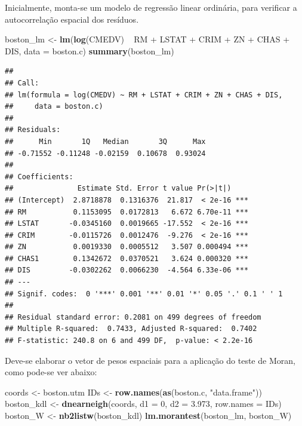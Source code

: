 \documentclass[12pt,]{article}
\newenvironment{Shaded}{\begin{snugshade}}{\end{snugshade}}
\newcommand{\KeywordTok}[1]{\textcolor[rgb]{0.13,0.29,0.53}{\textbf{{#1}}}}
\newcommand{\DataTypeTok}[1]{\textcolor[rgb]{0.13,0.29,0.53}{{#1}}}
\newcommand{\DecValTok}[1]{\textcolor[rgb]{0.00,0.00,0.81}{{#1}}}
\newcommand{\FloatTok}[1]{\textcolor[rgb]{0.00,0.00,0.81}{{#1}}}
\newcommand{\StringTok}[1]{\textcolor[rgb]{0.31,0.60,0.02}{{#1}}}
\newcommand{\NormalTok}[1]{{#1}}
\begin{document}
Inicialmente, monta-se um modelo de regressão linear ordinária, para
verificar a autocorrelação espacial dos resíduos.

\begin{Shaded}
\begin{Highlighting}[]
\NormalTok{boston_lm <-}\StringTok{ }\KeywordTok{lm}\NormalTok{(}\KeywordTok{log}\NormalTok{(CMEDV) ~}\StringTok{ }\NormalTok{RM +}\StringTok{ }\NormalTok{LSTAT +}\StringTok{ }\NormalTok{CRIM +}\StringTok{ }\NormalTok{ZN +}\StringTok{ }\NormalTok{CHAS +}\StringTok{ }\NormalTok{DIS, }\DataTypeTok{data =} \NormalTok{boston.c)}
\KeywordTok{summary}\NormalTok{(boston_lm)}
\end{Highlighting}
\end{Shaded}

\begin{verbatim}
## 
## Call:
## lm(formula = log(CMEDV) ~ RM + LSTAT + CRIM + ZN + CHAS + DIS, 
##     data = boston.c)
## 
## Residuals:
##      Min       1Q   Median       3Q      Max 
## -0.71552 -0.11248 -0.02159  0.10678  0.93024 
## 
## Coefficients:
##               Estimate Std. Error t value Pr(>|t|)    
## (Intercept)  2.8718878  0.1316376  21.817  < 2e-16 ***
## RM           0.1153095  0.0172813   6.672 6.70e-11 ***
## LSTAT       -0.0345160  0.0019665 -17.552  < 2e-16 ***
## CRIM        -0.0115726  0.0012476  -9.276  < 2e-16 ***
## ZN           0.0019330  0.0005512   3.507 0.000494 ***
## CHAS1        0.1342672  0.0370521   3.624 0.000320 ***
## DIS         -0.0302262  0.0066230  -4.564 6.33e-06 ***
## ---
## Signif. codes:  0 '***' 0.001 '**' 0.01 '*' 0.05 '.' 0.1 ' ' 1
## 
## Residual standard error: 0.2081 on 499 degrees of freedom
## Multiple R-squared:  0.7433, Adjusted R-squared:  0.7402 
## F-statistic: 240.8 on 6 and 499 DF,  p-value: < 2.2e-16
\end{verbatim}

Deve-se elaborar o vetor de pesos espaciais para a aplicação do teste de
Moran, como pode-se ver abaixo:

\begin{Shaded}
\begin{Highlighting}[]
\NormalTok{coords <-}\StringTok{ }\NormalTok{boston.utm}
\NormalTok{IDs <-}\StringTok{ }\KeywordTok{row.names}\NormalTok{(}\KeywordTok{as}\NormalTok{(boston.c, }\StringTok{"data.frame"}\NormalTok{))}
\NormalTok{boston_kdl <-}\StringTok{ }\KeywordTok{dnearneigh}\NormalTok{(coords, }\DataTypeTok{d1 =} \DecValTok{0}\NormalTok{, }\DataTypeTok{d2 =} \FloatTok{3.973}\NormalTok{, }\DataTypeTok{row.names =} \NormalTok{IDs)}
\NormalTok{boston_W <-}\StringTok{ }\KeywordTok{nb2listw}\NormalTok{(boston_kdl)}
\KeywordTok{lm.morantest}\NormalTok{(boston_lm, boston_W)}
\end{Highlighting}
\end{Shaded}
\end{document}
